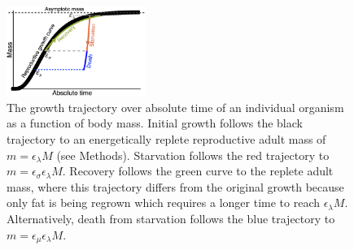 \documentclass[twocolumn,preprintnumbers,amsmath,amssymb,superscriptaddress]{revtex4}
\begin{document}

\begin{figure}
\centering
\includegraphics[width=0.4\textwidth]{Growth-trajectory-diagram.eps}
\caption{\small{ The growth trajectory over absolute time of an individual organism as a function of body mass.  
Initial growth follows the black trajectory to an energetically replete reproductive adult mass of $m=\epsilon_\lambda M$ (see Methods). %
Starvation follows the red trajectory to $m = \epsilon_\sigma \epsilon_\lambda  M$. 
Recovery follows the green curve to the replete adult mass, where this trajectory differs from the original growth because only fat is being regrown which requires a longer time to reach $\epsilon_\lambda M$. %
Alternatively, death from starvation follows the blue trajectory to $m=\epsilon_\mu \epsilon_\lambda  M$.}\label{fig:growth}}
\end{figure}
\end{document}
